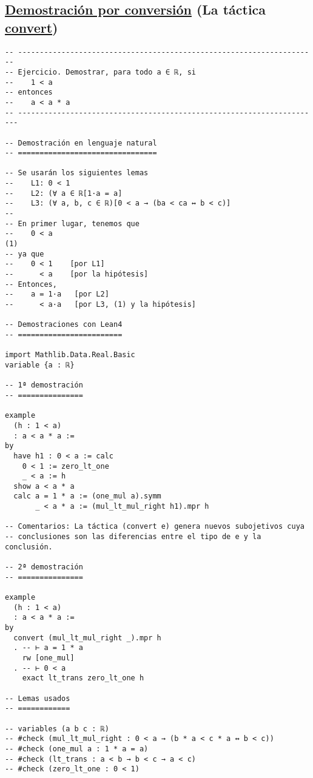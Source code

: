 \subsection{\href{./src/Logica/Demostracion\_por\_conversion.lean}{Demostración por conversión} (La táctica \href{https://bit.ly/2Bgujiu}{convert})}
\label{sec:org8717f25}
\begin{verbatim}
-- ---------------------------------------------------------------------
-- Ejercicio. Demostrar, para todo a ∈ ℝ, si
--    1 < a
-- entonces
--    a < a * a
-- ----------------------------------------------------------------------

-- Demostración en lenguaje natural
-- ================================

-- Se usarán los siguientes lemas
--    L1: 0 < 1
--    L2: (∀ a ∈ ℝ[1·a = a]
--    L3: (∀ a, b, c ∈ ℝ)[0 < a → (ba < ca ↔ b < c)]
--
-- En primer lugar, tenemos que
--    0 < a                                                          (1)
-- ya que
--    0 < 1    [por L1]
--      < a    [por la hipótesis]
-- Entonces,
--    a = 1·a   [por L2]
--      < a·a   [por L3, (1) y la hipótesis]

-- Demostraciones con Lean4
-- ========================

import Mathlib.Data.Real.Basic
variable {a : ℝ}

-- 1ª demostración
-- ===============

example
  (h : 1 < a)
  : a < a * a :=
by
  have h1 : 0 < a := calc
    0 < 1 := zero_lt_one
    _ < a := h
  show a < a * a
  calc a = 1 * a := (one_mul a).symm
       _ < a * a := (mul_lt_mul_right h1).mpr h

-- Comentarios: La táctica (convert e) genera nuevos subojetivos cuya
-- conclusiones son las diferencias entre el tipo de e y la conclusión.

-- 2ª demostración
-- ===============

example
  (h : 1 < a)
  : a < a * a :=
by
  convert (mul_lt_mul_right _).mpr h
  . -- ⊢ a = 1 * a
    rw [one_mul]
  . -- ⊢ 0 < a
    exact lt_trans zero_lt_one h

-- Lemas usados
-- ============

-- variables (a b c : ℝ)
-- #check (mul_lt_mul_right : 0 < a → (b * a < c * a ↔ b < c))
-- #check (one_mul a : 1 * a = a)
-- #check (lt_trans : a < b → b < c → a < c)
-- #check (zero_lt_one : 0 < 1)
\end{verbatim}

